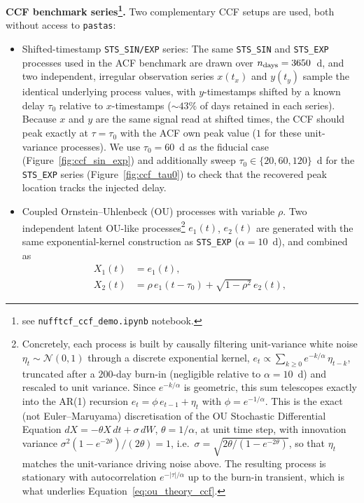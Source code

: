 \documentclass[twocolumn,10pt]{article}
\newcommand{\pastas}{\texttt{pastas}\xspace}
\begin{document}
\textbf{CCF benchmark series\footnote{see \texttt{nufftcf\_ccf\_demo.ipynb} notebook.}.} Two complementary CCF setups are used, both
without access to \pastas:
\begin{itemize}
	\item Shifted-timestamp \texttt{STS\_SIN/EXP} series: The same \texttt{STS\_SIN} and \texttt{STS\_EXP} processes
	used in the ACF benchmark are drawn over $n_{\rm days}=3650$~d, and
	two independent, irregular observation series $x(t_x)$ and $y(t_y)$
	sample the identical underlying process values, with $y$-timestamps 
	shifted by a known delay $\tau_0$ relative to $x$-timestamps
	($\sim43\%$ of days retained in each series). Because $x$ and $y$
	are the same signal read at shifted times, the CCF should peak
	exactly at $\tau=\tau_0$ with the ACF own peak value ($1$ for these
	unit-variance processes). We use $\tau_0=60$~d as the fiducial case
	(Figure~\ref{fig:ccf_sin_exp}) and additionally sweep
	$\tau_0\in\{20,60,120\}$~d for the \texttt{STS\_EXP} series
	(Figure~\ref{fig:ccf_tau0}) to check that the recovered peak location
	tracks the injected delay.
	\item Coupled Ornstein--Uhlenbeck (OU) processes with variable
		$\rho$. Two independent latent OU-like processes\footnote{Concretely, each process is built by causally filtering
			unit-variance white noise $\eta_t\sim\mathcal N(0,1)$ through a
			discrete exponential kernel, $e_t \propto \sum_{k\geq 0}
			e^{-k/\alpha}\,\eta_{t-k}$, truncated after a $200$-day burn-in
			(negligible relative to $\alpha=10$~d) and rescaled to unit variance.
			Since $e^{-k/\alpha}$ is geometric, this sum telescopes exactly into
			the AR(1) recursion $e_t = \phi\, e_{t-1} + \eta_t$ with
			$\phi=e^{-1/\alpha}$. This is the exact (not Euler--Maruyama)
			discretisation of the OU Stochastic Differential Equation $dX = -\theta X\,dt + \sigma\,dW$,
			$\theta=1/\alpha$, at unit time step, with innovation variance
			$\sigma^2(1-e^{-2\theta})/(2\theta)=1$, i.e.\
			$\sigma=\sqrt{2\theta/(1-e^{-2\theta})}$, so that $\eta_t$ matches the
			unit-variance driving noise above. The resulting process is
			stationary with autocorrelation $e^{-|\tau|/\alpha}$ up to the
			burn-in transient, which is what underlies
			Equation~\eqref{eq:ou_theory_ccf}.} $e_1(t)$,
	$e_2(t)$ are generated with the same exponential-kernel construction
	as \texttt{STS\_EXP} ($\alpha=10$~d), and combined as
	\begin{align}
		X_1(t) &= e_1(t), \nonumber \\
		X_2(t) &= \rho\, e_1(t-\tau_0) + \sqrt{1-\rho^2}\, e_2(t),

\end{align}
\end{itemize}
\end{document}
